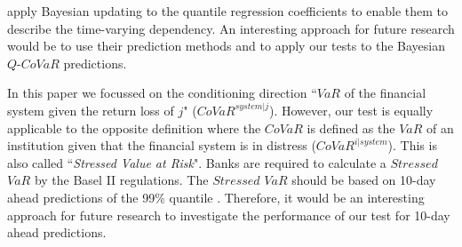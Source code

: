 \documentclass[12pt]{article}
\begin{document}
\citet{bayesian} apply Bayesian updating to the quantile regression coefficients to enable them to describe the time-varying dependency. An interesting approach for future research would be to use their prediction methods and to apply our tests to the Bayesian $Q$-$CoVaR$ predictions.

In this paper we focussed on the conditioning direction ``$VaR$ of the financial system given the return loss of $j$" ($CoVaR^{system|j}$). However, our test is equally applicable to the opposite definition where the $CoVaR$ is defined as the $VaR$ of an institution given that the financial system is in distress ($CoVaR^{i|system}$). This is also called ``\textit{Stressed Value at Risk}". Banks are required to calculate a $Stressed$ $VaR$ by the Basel II regulations. The $Stressed$ $VaR$ should be based on 10-day ahead predictions of the 99\% quantile \citep[][p. 14]{baselii}. Therefore, it would be an interesting approach for future research to investigate the performance of our test for 10-day ahead predictions.








\end{document}
